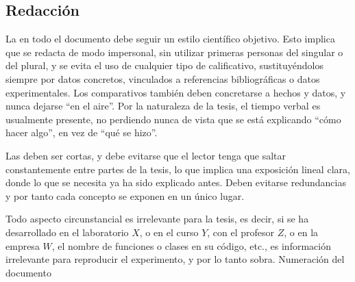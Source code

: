 








 


\subsection{Redacción}

La  en todo el documento debe seguir un estilo científico
objetivo. Esto implica que se redacta de modo impersonal, sin utilizar primeras
personas del singular o del plural, y se evita el uso de cualquier tipo de
calificativo, sustituyéndolos siempre por datos concretos, vinculados a
referencias bibliográficas o datos experimentales. Los comparativos también
deben concretarse a hechos y datos, y nunca dejarse ``en el aire''. Por la
naturaleza de la tesis, el tiempo verbal es usualmente presente, no perdiendo
nunca de vista que se está explicando ``cómo hacer algo'', en vez de ``qué se
hizo''.

Las  deben ser cortas, y debe evitarse que el lector tenga que saltar
constantemente entre partes de la tesis, lo que implica una exposición lineal
clara, donde lo que se necesita ya ha sido explicado antes. Deben evitarse
redundancias y por tanto cada concepto se exponen en un único lugar.

Todo aspecto circunstancial es irrelevante para la tesis, es decir, si se ha
desarrollado en el laboratorio $X$, o en el curso $Y$, con el profesor $Z$, o
en la empresa $W$, el nombre de funciones o clases en su código, etc., es
información irrelevante para reproducir el experimento, y por lo tanto sobra.
Numeración del documento


